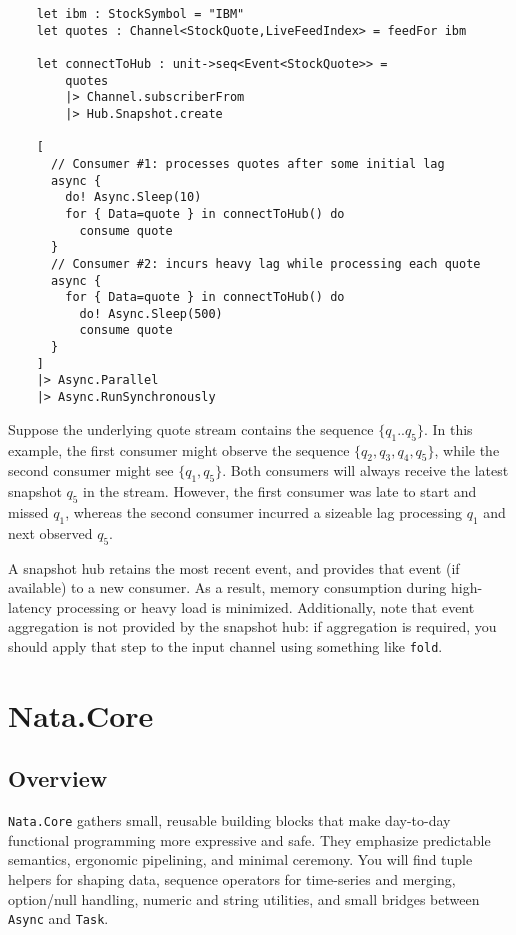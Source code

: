 \documentclass{article}
\begin{document}
\begin{verbatim}
    let ibm : StockSymbol = "IBM"
    let quotes : Channel<StockQuote,LiveFeedIndex> = feedFor ibm

    let connectToHub : unit->seq<Event<StockQuote>> =
        quotes
        |> Channel.subscriberFrom
        |> Hub.Snapshot.create

    [
      // Consumer #1: processes quotes after some initial lag
      async {
        do! Async.Sleep(10)
        for { Data=quote } in connectToHub() do
          consume quote 
      }
      // Consumer #2: incurs heavy lag while processing each quote
      async {
        for { Data=quote } in connectToHub() do
          do! Async.Sleep(500)
          consume quote
      }
    ]
    |> Async.Parallel
    |> Async.RunSynchronously
\end{verbatim}

Suppose the underlying quote stream contains the sequence $\{q_1..q_5\}$. In this example, the first consumer might observe the sequence $\{q_2,q_3,q_4,q_5\}$, while the second consumer might see $\{q_1,q_5\}$. Both consumers will always receive the latest snapshot $q_5$ in the stream.  However, the first consumer was late to start and missed $q_1$, whereas the second consumer incurred a sizeable lag processing $q_1$ and next observed $q_5$.

A snapshot hub retains the most recent event, and provides that event (if available) to a new consumer. As a result, memory consumption during high-latency processing or heavy load is minimized.  Additionally, note that event aggregation is not provided by the snapshot hub: if aggregation is required, you should apply that step to the input channel using something like \texttt{fold}.

\clearpage
\section{Nata.Core}

\subsection{Overview}

\noindent \texttt{Nata.Core} gathers small, reusable building blocks that make day-to-day functional programming more expressive and safe. 
They emphasize predictable semantics, ergonomic pipelining, and minimal ceremony. 
You will find tuple helpers for shaping data, sequence operators for time-series and merging, option/null handling, numeric and string utilities, and small bridges between \texttt{Async} and \texttt{Task}.
\end{document}
